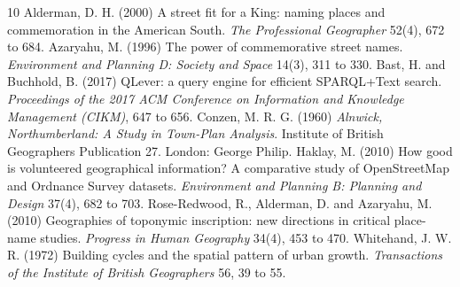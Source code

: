 \documentclass[11pt,a4paper]{article}
\begin{document}
\begin{thebibliography}{10}
 Alderman, D. H. (2000) A street fit for a King: naming places and commemoration in the American South. \textit{The Professional Geographer} 52(4), 672 to 684.
 Azaryahu, M. (1996) The power of commemorative street names. \textit{Environment and Planning D: Society and Space} 14(3), 311 to 330.
 Bast, H. and Buchhold, B. (2017) QLever: a query engine for efficient SPARQL+Text search. \textit{Proceedings of the 2017 ACM Conference on Information and Knowledge Management (CIKM)}, 647 to 656.
 Conzen, M. R. G. (1960) \textit{Alnwick, Northumberland: A Study in Town-Plan Analysis}. Institute of British Geographers Publication 27. London: George Philip.
 Haklay, M. (2010) How good is volunteered geographical information? A comparative study of OpenStreetMap and Ordnance Survey datasets. \textit{Environment and Planning B: Planning and Design} 37(4), 682 to 703.
 Rose-Redwood, R., Alderman, D. and Azaryahu, M. (2010) Geographies of toponymic inscription: new directions in critical place-name studies. \textit{Progress in Human Geography} 34(4), 453 to 470.
 Whitehand, J. W. R. (1972) Building cycles and the spatial pattern of urban growth. \textit{Transactions of the Institute of British Geographers} 56, 39 to 55.
\end{thebibliography}
\end{document}
